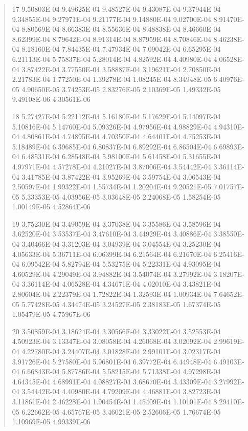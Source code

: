 \documentclass[letterpaper,10pt,english]{sphinxmanual}
\begin{document}
\begin{quote}
\begin{DUlineblock}{0em}
\item[] 17   9.50803E-04  9.49625E-04  9.48527E-04  9.43087E-04  9.37944E-04  9.34855E-04  9.27971E-04  9.21177E-04  9.14880E-04  9.02700E-04  8.91470E-04  8.80569E-04  8.66383E-04  8.55636E-04  8.48838E-04  8.46660E-04  8.62399E-04  8.79642E-04  8.91314E-04  8.87959E-04  8.70846E-04  8.46238E-04  8.18160E-04  7.84435E-04  7.47934E-04  7.09042E-04  6.65295E-04  6.21113E-04  5.75837E-04  5.28014E-04  4.82592E-04  4.40980E-04  4.06528E-04  3.87422E-04  3.77550E-04  3.58887E-04  3.19621E-04  2.70850E-04  2.21783E-04  1.77250E-04  1.39278E-04  1.08245E-04  8.34948E-05  6.40976E-05  4.90650E-05  3.74253E-05  2.83276E-05  2.10369E-05  1.49332E-05  9.49108E-06  4.30561E-06
\item[] 18   5.27427E-04  5.22112E-04  5.16180E-04  5.17629E-04  5.14097E-04  5.10816E-04  5.14760E-04  5.09326E-04  4.97956E-04  4.98829E-04  4.94310E-04  4.80861E-04  4.74895E-04  4.70350E-04  4.64401E-04  4.75253E-04  5.18489E-04  6.39685E-04  6.80837E-04  6.89292E-04  6.86504E-04  6.69893E-04  6.48531E-04  6.28548E-04  5.98100E-04  5.61458E-04  5.31655E-04  4.97971E-04  4.57278E-04  4.21027E-04  3.87006E-04  3.54442E-04  3.36114E-04  3.41785E-04  3.87422E-04  3.95269E-04  3.59754E-04  3.06543E-04  2.50597E-04  1.99322E-04  1.55734E-04  1.20204E-04  9.20521E-05  7.01757E-05  5.33353E-05  4.03956E-05  3.03648E-05  2.24068E-05  1.58254E-05  1.00149E-05  4.52864E-06
\item[] 19   3.75230E-04  3.49059E-04  3.37038E-04  3.35586E-04  3.58596E-04  3.62520E-04  3.53537E-04  3.47610E-04  3.44929E-04  3.40886E-04  3.38550E-04  3.40466E-04  3.31203E-04  3.04939E-04  3.04554E-04  3.25230E-04  4.05633E-04  5.36711E-04  6.06399E-04  6.21564E-04  6.21670E-04  6.25416E-04  6.09542E-04  5.82794E-04  5.53275E-04  5.22331E-04  4.93095E-04  4.60529E-04  4.29049E-04  3.94882E-04  3.54074E-04  3.27992E-04  3.18207E-04  3.36114E-04  4.06528E-04  4.34671E-04  4.02010E-04  3.43821E-04  2.80604E-04  2.22379E-04  1.72822E-04  1.32593E-04  1.00934E-04  7.64652E-05  5.77428E-05  4.34474E-05  3.24527E-05  2.38183E-05  1.67374E-05  1.05479E-05  4.75967E-06
\item[] 20   3.50859E-04  3.18624E-04  3.30566E-04  3.33022E-04  3.52553E-04  4.50923E-04  3.13347E-04  3.08058E-04  4.26068E-04  3.02092E-04  2.99619E-04  4.22780E-04  3.24407E-04  3.01828E-04  2.99101E-04  3.02317E-04  3.91726E-04  5.27580E-04  5.96801E-04  6.39772E-04  6.44948E-04  6.49103E-04  6.66843E-04  5.87786E-04  5.58215E-04  5.71338E-04  4.97298E-04  4.64345E-04  4.68991E-04  4.08827E-04  3.68670E-04  3.43309E-04  3.27992E-04  3.54442E-04  4.40980E-04  4.79209E-04  4.46881E-04  3.82723E-04  3.11861E-04  2.46228E-04  1.90454E-04  1.45409E-04  1.10101E-04  8.29410E-05  6.22662E-05  4.65767E-05  3.46021E-05  2.52606E-05  1.76674E-05  1.10969E-05  4.99339E-06

\end{DUlineblock}
\end{quote}
\end{document}
